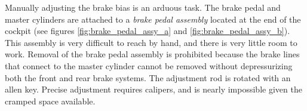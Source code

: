 Manually adjusting the brake bias is an arduous task. The brake pedal and master cylinders are 
attached to a \emph{brake pedal assembly} located at the end of the cockpit (see figures
\ref{fig:brake_pedal_assy_a} and \ref{fig:brake_pedal_assy_b}). This assembly is very difficult to 
reach by hand, and there is very little room to work. Removal of the brake pedal assembly is 
prohibited because the brake lines that connect to the master cylinder cannot be removed without 
depressurizing both the front and rear brake systems. The adjustment rod is rotated with an allen 
key. Precise adjustment requires calipers, and is nearly impossible given the cramped space available.

\begin{figure}[h!]
	\centering
\end{figure}
